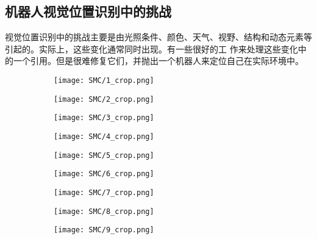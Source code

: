\subsection{机器人视觉位置识别中的挑战}
视觉位置识别中的挑战主要是由光照条件、颜色、天气、视野、结构和动态元素等引起的。实际上，这些变化通常同时出现。有一些很好的工
作来处理这些变化中的一个引用。但是很难修复它们，并抛出一个机器人来定位自己在实际环境中。
\begin{figure}[h]
	\begin{subfigure}[c]{0.22\textwidth}
        \texttt{[image: SMC/1\_crop.png]}
        \label{fig:DifferentConditiona}
    \end{subfigure} 
    \begin{subfigure}[c]{0.22\textwidth}    
        \texttt{[image: SMC/2\_crop.png]}
        \label{fig:DifferentConditionb}    
    \end{subfigure} 
    \begin{subfigure}[c]{0.22\textwidth}    
    	\texttt{[image: SMC/3\_crop.png]}
    	\label{fig:DifferentConditionc}    
    \end{subfigure}
    \begin{subfigure}[c]{0.22\textwidth}    
    	\texttt{[image: SMC/4\_crop.png]}
    	\label{fig:DifferentConditiond}    
    \end{subfigure}
    \begin{subfigure}[c]{0.22\textwidth}    
    	\texttt{[image: SMC/5\_crop.png]}
    	\label{fig:DifferentConditione}    
    \end{subfigure}
    \begin{subfigure}[c]{0.22\textwidth}    
    	\texttt{[image: SMC/6\_crop.png]}
    	\label{fig:DifferentConditionf}    
    \end{subfigure}
    \begin{subfigure}[c]{0.22\textwidth}    
    	\texttt{[image: SMC/7\_crop.png]}
    	\label{fig:DifferentConditiong}    
    \end{subfigure} 
    \begin{subfigure}[c]{0.22\textwidth}    
    	\texttt{[image: SMC/8\_crop.png]}
    	\label{fig:DifferentConditionh}    
    \end{subfigure} 
    \begin{subfigure}[c]{0.22\textwidth}    
    	\texttt{[image: SMC/9\_crop.png]}
    	\label{fig:DifferentConditioni}    
	\end{subfigure} 

\end{figure}

